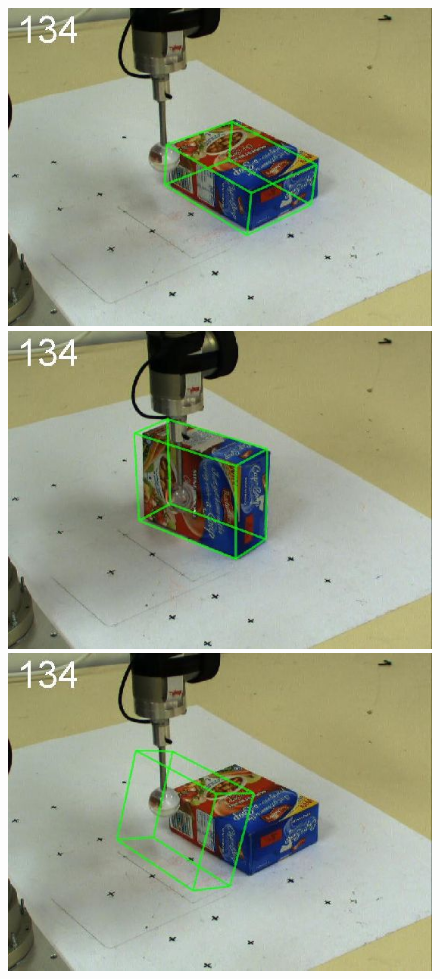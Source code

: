 \begin{figure}[htbp]
{\includegraphics[width=\imgAXwid]{./A2_2exp_399_3}
\includegraphics[width=\imgAXwid]{./A2_2exp_87_3}
\includegraphics[width=\imgAXwid]{./A2_LWPR1_399_3}
}
\end{figure}
